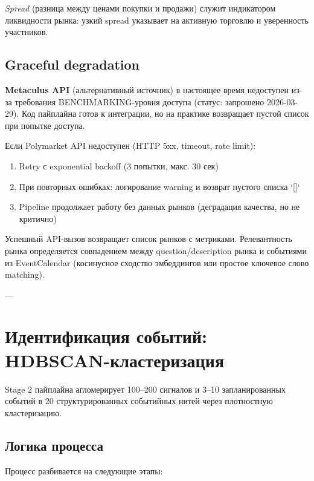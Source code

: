 \textit{Spread} (разница между ценами покупки и продажи) служит индикатором ликвидности рынка: узкий spread указывает на активную торговлю и уверенность участников.


\subsection{Graceful degradation}

\textbf{Metaculus API} (альтернативный источник) в настоящее время недоступен из-за требования BENCHMARKING-уровня доступа (статус: запрошено 2026-03-29). Код пайплайна готов к интеграции, но на практике возвращает пустой список при попытке доступа.

Если Polymarket API недоступен (HTTP 5xx, timeout, rate limit):
\begin{enumerate}
    \item Retry с exponential backoff (3 попытки, макс. 30 сек)
    \item При повторных ошибках: логирование warning и возврат пустого списка `[]`
    \item Pipeline продолжает работу без данных рынков (деградация качества, но не критично)
\end{enumerate}

Успешный API-вызов возвращает список рынков с метриками. Релевантность рынка определяется совпадением между question/description рынка и событиями из EventCalendar (косинусное сходство эмбеддингов или простое ключевое слово matching).

---

\section{Идентификация событий: HDBSCAN-кластеризация}

Stage 2 пайплайна агломерирует 100--200 сигналов и 3--10 запланированных событий в 20 структурированных событийных нитей через плотностную кластеризацию.


\subsection{Логика процесса}

Процесс разбивается на следующие этапы:

